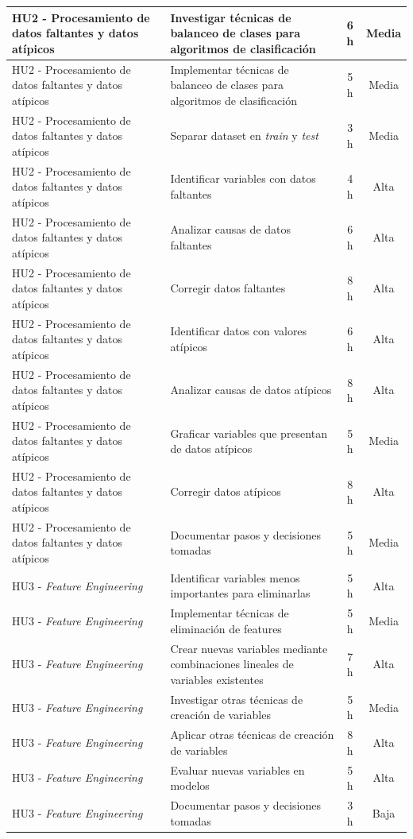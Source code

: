 \documentclass[
11pt, %
]{charter}
\begin{document}
\begin{xltabular}{\linewidth}{@{}|X|X|c|c|@{}}
HU2 - Procesamiento de datos faltantes y datos atípicos & Investigar técnicas de balanceo de clases para algoritmos de clasificación & 6 h & Media \\ \hline
HU2 - Procesamiento de datos faltantes y datos atípicos & Implementar técnicas de balanceo de clases para algoritmos de clasificación & 5 h & Media \\ \hline
HU2 - Procesamiento de datos faltantes y datos atípicos & Separar dataset en \textit{train} y \textit{test} & 3 h & Media \\ \hline
HU2 - Procesamiento de datos faltantes y datos atípicos & Identificar variables con datos faltantes & 4 h & Alta \\ \hline
HU2 - Procesamiento de datos faltantes y datos atípicos & Analizar causas de datos faltantes & 6 h & Alta \\ \hline
HU2 - Procesamiento de datos faltantes y datos atípicos & Corregir datos faltantes & 8 h & Alta \\ \hline
HU2 - Procesamiento de datos faltantes y datos atípicos & Identificar datos con valores atípicos & 6 h & Alta \\ \hline
HU2 - Procesamiento de datos faltantes y datos atípicos & Analizar causas de datos atípicos & 8 h & Alta \\ \hline
HU2 - Procesamiento de datos faltantes y datos atípicos & Graficar variables que presentan de datos atípicos & 5 h & Media \\ \hline
HU2 - Procesamiento de datos faltantes y datos atípicos & Corregir datos atípicos & 8 h & Alta \\ \hline
HU2 - Procesamiento de datos faltantes y datos atípicos & Documentar pasos y decisiones tomadas & 5 h & Media \\ \hline
HU3 - \textit{Feature Engineering} & Identificar variables menos importantes para eliminarlas & 5 h & Alta \\ \hline
HU3 - \textit{Feature Engineering} & Implementar técnicas de eliminación de features & 5 h & Media \\ \hline
HU3 - \textit{Feature Engineering} & Crear nuevas variables mediante combinaciones lineales de variables existentes & 7 h & Alta \\ \hline
HU3 - \textit{Feature Engineering} & Investigar otras técnicas de creación de variables & 5 h & Media \\ \hline
HU3 - \textit{Feature Engineering} & Aplicar otras técnicas de creación de variables & 8 h & Alta \\ \hline
HU3 - \textit{Feature Engineering} & Evaluar nuevas variables en modelos & 5 h & Alta \\ \hline
HU3 - \textit{Feature Engineering} & Documentar pasos y decisiones tomadas & 3 h & Baja \\ \hline


\end{xltabular}
\end{document}
